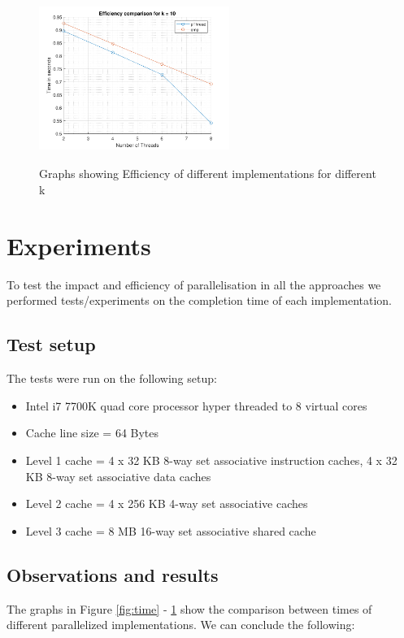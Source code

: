 \documentclass[letter, 11pt, margin=1in]{article}
\begin{document}
\begin{figure}[h]
    \includegraphics[width=6.2cm,height=5.5cm]{tek10}
    \caption{Graphs showing Efficiency of different implementations for different k}
    \label{fig:efficiency}
\end{figure}

\section{Experiments}

To test the impact and efficiency of parallelisation in all the approaches we performed tests/experiments on the completion time of each implementation.

\subsection{Test setup}
The tests were run on the following setup:
\begin{itemize}
    \item Intel i7 7700K quad core processor hyper threaded to 8 virtual cores
    \item Cache line size = 64 Bytes
    \item Level 1 cache = 4 x 32 KB 8-way set associative instruction caches, 4 x 32 KB 8-way set associative data caches
    \item Level 2 cache = 4 x 256 KB 4-way set associative caches
    \item Level 3 cache = 8 MB 16-way set associative shared cache
\end{itemize}

\subsection{Observations and results}

The graphs in Figure \ref{fig:time} - \ref{fig:efficiency} show the comparison between times of different parallelized implementations. We can conclude the following:
\end{document}
